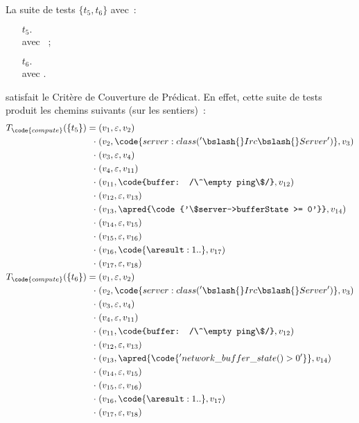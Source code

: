 \begin{example}

La suite de tests $\{t_5, t_6\}$ avec~:
%
\begin{itemize}

\item[$t_5.$]  \\
avec ~;

\item[$t_6.$]  \\
avec .

\end{itemize}
%
satisfait le Critère de Couverture de Prédicat. En effet, cette suite de tests
produit les chemins suivants (sur les sentiers)~:
%
\begin{align*}
%
T_\code{compute}(\{t_5\}) =\;
          & (v_1, \varepsilon, v_2) \\
  \cdot\; & (v_2, \code{server: class('\bslash{}Irc\bslash{}Server')}, v_3) \\
  \cdot\; & (v_3, \varepsilon, v_4) \\
  \cdot\; & (v_4, \varepsilon, v_{11}) \\
  \cdot\; & (v_{11}, \code{buffer: /\^\empty ping\$/}, v_{12}) \\
  \cdot\; & (v_{12}, \varepsilon, v_{13}) \\
  \cdot\; & (v_{13}, \apred{\code{'\$server->bufferState >= 0'}}, v_{14}) \\
  \cdot\; & (v_{14}, \varepsilon, v_{15}) \\
  \cdot\; & (v_{15}, \varepsilon, v_{16}) \\
  \cdot\; & (v_{16}, \code{\aresult: 1..}, v_{17}) \\
  \cdot\; & (v_{17}, \varepsilon, v_{18}) \\
%
T_\code{compute}(\{t_6\}) =\;
          & (v_1, \varepsilon, v_2) \\
  \cdot\; & (v_2, \code{server: class('\bslash{}Irc\bslash{}Server')}, v_3) \\
  \cdot\; & (v_3, \varepsilon, v_4) \\
  \cdot\; & (v_4, \varepsilon, v_{11}) \\
  \cdot\; & (v_{11}, \code{buffer: /\^\empty ping\$/}, v_{12}) \\
  \cdot\; & (v_{12}, \varepsilon, v_{13}) \\
  \cdot\; & (v_{13}, \apred{\code{'network\_buffer\_state() > 0'}}, v_{14}) \\
  \cdot\; & (v_{14}, \varepsilon, v_{15}) \\
  \cdot\; & (v_{15}, \varepsilon, v_{16}) \\
  \cdot\; & (v_{16}, \code{\aresult: 1..}, v_{17}) \\
  \cdot\; & (v_{17}, \varepsilon, v_{18}) \\
%
\end{align*}

\end{example}

